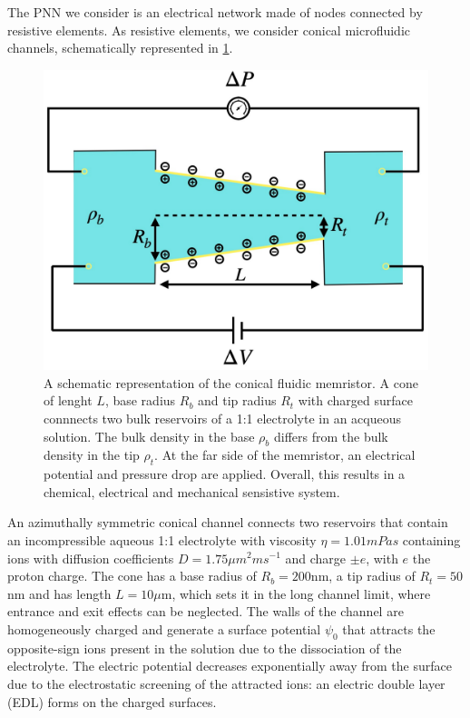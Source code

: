 \documentclass[reprint,superscriptaddress,prb,showkeys]{revtex4-2}
\begin{document}
The PNN we consider is an electrical network made of nodes connected by resistive elements. As resistive elements, we consider conical microfluidic channels, schematically represented in \cref{fig:memristor_scheme}. 
\begin{figure}[h]
    \centering
    \includegraphics[width=\columnwidth]{plots/memristor/memristor_scheme.pdf}
    \caption{A schematic representation of the conical fluidic memristor. A cone of lenght $L$, base radius $R_b$ and tip radius $R_t$ with charged surface connnects two bulk reservoirs of a 1:1 electrolyte in an acqueous solution. The bulk density in the base $\rho_b$ differs from the bulk density in the tip $\rho_t$. At the far side of the memristor, an electrical potential and pressure drop are applied. Overall, this results in a chemical, electrical and mechanical sensistive system.}\label{fig:memristor_scheme}
\end{figure} 
An azimuthally symmetric conical channel connects two reservoirs that contain an incompressible aqueous 1:1 electrolyte with viscosity $\eta=1.01mPa s$ containing ions with diffusion coefficients $D = 1.75\mu m^2 ms^{-1}$ and charge $\pm e$, with $e$ the proton charge. The cone has a base radius of $R_b = 200$nm, a tip radius of $R_t=50$nm and has length $L = 10\mu$m, which sets it in the long channel limit, where entrance and exit effects can be neglected. The walls of the channel are homogeneously charged and generate a surface potential $\psi_0$ that attracts the opposite-sign ions present in the solution due to the dissociation of the electrolyte. The electric potential decreases exponentially away from the surface due to the electrostatic screening of the attracted ions: an electric double layer (EDL) forms on the charged surfaces. 
\end{document}
